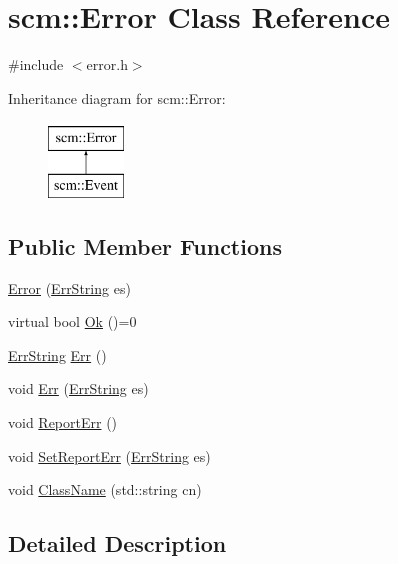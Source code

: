 \hypertarget{classscm_1_1_error}{
\section{scm::Error Class Reference}
\label{classscm_1_1_error}
}


{\ttfamily \#include $<$error.h$>$}

Inheritance diagram for scm::Error:\begin{figure}[H]
\begin{center}
\leavevmode
\includegraphics[height=2cm]{classscm_1_1_error}
\end{center}
\end{figure}
\subsection*{Public Member Functions}
\begin{DoxyCompactItemize}
\item 
\hyperlink{classscm_1_1_error_a9c6aa255ce180155a748f304f83830d3}{Error} (\hyperlink{namespacescm_a13a6ecf77ceb7b5b3a38e0fada54aa99}{ErrString} es)
\item 
virtual bool \hyperlink{classscm_1_1_error_a2660b73f9671be3f286bed9d622a926a}{Ok} ()=0
\item 
\hyperlink{namespacescm_a13a6ecf77ceb7b5b3a38e0fada54aa99}{ErrString} \hyperlink{classscm_1_1_error_a8fa002269b2ea7b0af4581951a7908f0}{Err} ()
\item 
void \hyperlink{classscm_1_1_error_aa4309b2556e84bd9bc6c7871f3be2f7a}{Err} (\hyperlink{namespacescm_a13a6ecf77ceb7b5b3a38e0fada54aa99}{ErrString} es)
\item 
void \hyperlink{classscm_1_1_error_a4dc4a630569665a615a0bfb321b65238}{ReportErr} ()
\item 
void \hyperlink{classscm_1_1_error_ace08c93643469a92cb3ca1e0fb1ca583}{SetReportErr} (\hyperlink{namespacescm_a13a6ecf77ceb7b5b3a38e0fada54aa99}{ErrString} es)
\item 
void \hyperlink{classscm_1_1_error_a3d3598611ee2955f3144ec2602b69677}{ClassName} (std::string cn)
\end{DoxyCompactItemize}


\subsection{Detailed Description}


